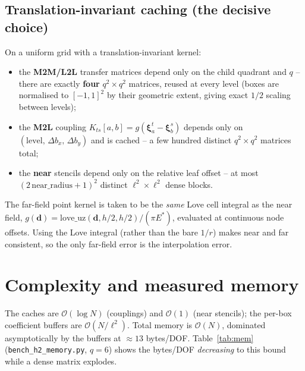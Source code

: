 \documentclass[11pt,a4paper]{article}
\newcommand{\Es}{E^{*}}
\newcommand{\Order}{\mathcal{O}}
\begin{document}
\subsection{Translation-invariant caching (the decisive choice)}
On a uniform grid with a translation-invariant kernel:
\begin{itemize}
\item the \textbf{M2M/L2L} transfer matrices depend only on the child
quadrant and $q$ -- there are exactly \textbf{four} $q^2\times q^2$ matrices,
reused at every level (boxes are normalised to $[-1,1]^2$ by their geometric
extent, giving exact $1/2$ scaling between levels);
\item the \textbf{M2L} coupling $K_{ts}[a,b]=g(\boldsymbol{\xi}_a^t-
\boldsymbol{\xi}_b^s)$ depends only on $(\text{level},\,\Delta b_x,\,\Delta
b_y)$ and is cached -- a few hundred distinct $q^2\times q^2$ matrices total;
\item the \textbf{near} stencils depend only on the relative leaf offset --
at most $(2\,\text{near\_radius}+1)^2$ distinct $\ell^2\times\ell^2$ dense
blocks.
\end{itemize}
The far-field point kernel is taken to be the \emph{same} Love cell integral
as the near field, $g(\mathbf{d})=\mathrm{love\_uz}(\mathbf{d},h/2,h/2)/(\pi
\Es)$, evaluated at continuous node offsets. Using the Love integral (rather
than the bare $1/r$) makes near and far consistent, so the only far-field
error is the interpolation error.

\section{Complexity and measured memory}

The caches are $\Order(\log N)$ (couplings) and $\Order(1)$ (near stencils);
the per-box coefficient buffers are $\Order(N/\ell^2)$. Total memory is
$\Order(N)$, dominated asymptotically by the buffers at $\approx 13$
bytes/DOF. Table~\ref{tab:mem} (\texttt{bench\_h2\_memory.py}, $q=6$) shows
the bytes/DOF \emph{decreasing} to this bound while a dense matrix explodes.
\end{document}
